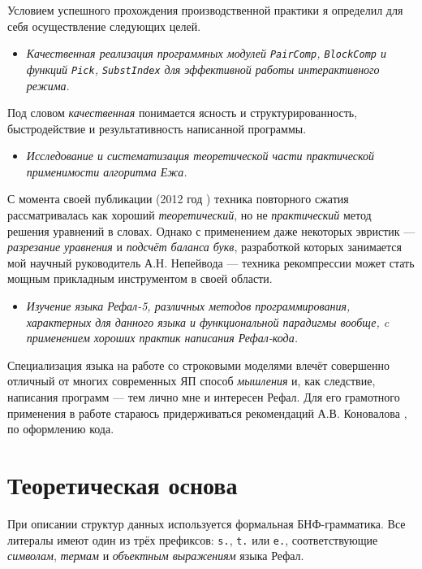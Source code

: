 \documentclass[12pt]{article}
\begin{document}
Условием успешного прохождения производственной практики я определил для себя
осуществление следующих целей.
\begin{itemize}
\item \emph{Качественная реализация программных модулей \texttt{PairComp},
\texttt{BlockComp} и функций \texttt{Pick}, \texttt{SubstIndex} для
эффективной работы интерактивного режима}.
\end{itemize}
Под словом \emph{качественная} понимается ясность и структурированность,
быстродействие и результативность написанной программы.
\begin{itemize}
\item \emph{Исследование и систематизация теоретической части практической
применимости алгоритма Ежа.}
\end{itemize}
С момента своей публикации (2012 год \cite{jez}) техника повторного сжатия
рассматривалась как хороший \emph{теоретический}, но не \emph{практический}
метод решения уравнений в словах. Однако с применением даже некоторых эвристик
--- \emph{разрезание уравнения} и \emph{подсчёт баланса букв}, разработкой
которых занимается мой научный руководитель А.Н. Непейвода --- техника
рекомпрессии может стать мощным прикладным инструментом в своей области.
\begin{itemize}
\item \emph{Изучение языка Рефал-5, различных методов программирования,
характерных для данного языка и функциональной парадигмы вообще, c применением
хороших практик написания Рефал-кода.}
\end{itemize}
Специализация языка на работе со строковыми моделями влечёт совершенно отличный
от многих современных ЯП способ \emph{мышления} и, как следствие, написания
программ --- тем лично мне и интересен Рефал. Для его грамотного применения
в работе стараюсь придерживаться рекомендаций А.В. Коновалова
\cite{konovalov-format}, \cite{konovalov-style} по оформлению кода.



\section{Теоретическая основа} \label{base}

При описании структур данных используется формальная БНФ-грамматика. Все
литералы имеют один из трёх префиксов: \texttt{s.}, \texttt{t.} или
\texttt{e.}, соответствующие \textit{символам}, \textit{термам} и
\textit{объектным выражениям} языка Рефал.
\end{document}
